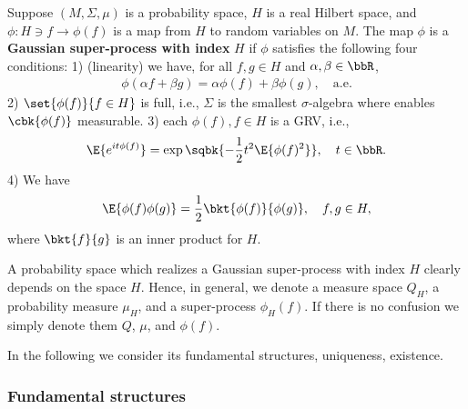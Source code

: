 \documentclass[openany, a4paper, oneside]{jsbook}
\begin{document}
\begin{defn}
 Suppose $(M, \Sigma, \mu)$ is a probability space, $H$ is a real Hilbert space,
 and $\phi \colon H \ni f \to \phi (f)$ is a map from $H$ to random variables on $M$.
 The map $\phi$ is a \textbf{Gaussian super-process with index} $H$ if $\phi$ satisfies
 the following four conditions:
 1) (linearity) we have, for all $f, g \in H$ and $\alpha, \beta \in \bbR$,
  \begin{align}
   \phi (\alpha f + \beta g) = \alpha \phi (f) + \beta \phi (g), \quad \mathrm{a.e.}
  \end{align}
 2) $\set{\phi (f)}{f \in H}$ is full, i.e., $\Sigma$ is the smallest $\sigma$-algebra where enables $\cbk{\phi (f)}$ measurable.
 3) each $\phi (f), f \in H$ is a GRV, i.e.,
  \begin{align}
   \E{e^{it \phi (f)}} = \exp \sqbk{- \frac{1}{2} t^2 \E{\phi (f)^2}}, \quad t \in \bbR.
  \end{align}
 4) We have
  \begin{align}
   \E{\phi (f) \phi (g)} = \frac{1}{2} \bkt{\phi (f)}{\phi (g)}, \quad f, g \in H,
  \end{align}
  where $\bkt{f}{g}$ is an inner product for $H$.
\end{defn}
A probability space which realizes a Gaussian super-process with index $H$ clearly depends on the space $H$.
Hence, in general, we denote a measure space $Q_{H}$, a probability measure $\mu_{H}$, and a super-process $\phi_{H}(f)$.
If there is no confusion we simply denote them $Q$, $\mu$, and $\phi (f)$.

In the following we consider its fundamental structures, uniqueness, existence.
\subsubsection{Fundamental structures}
\end{document}
